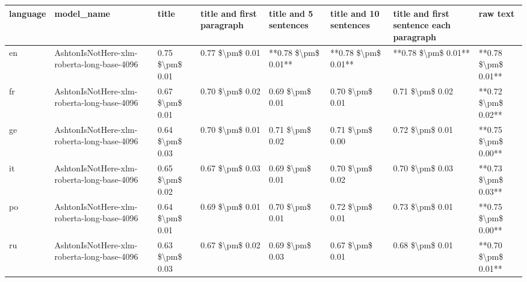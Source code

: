\begin{tabular}{llllllll}
\toprule
language &                                 model\_name &           title & title and first paragraph & title and 5 sentences & title and 10 sentences & title and first sentence each paragraph &            raw text \\
\midrule
      en & AshtonIsNotHere-xlm-roberta-long-base-4096 & 0.75 \$\textbackslash pm\$ 0.01 &           0.77 \$\textbackslash pm\$ 0.01 &   **0.78 \$\textbackslash pm\$ 0.01** &    **0.78 \$\textbackslash pm\$ 0.01** &                     **0.78 \$\textbackslash pm\$ 0.01** & **0.78 \$\textbackslash pm\$ 0.01** \\
      fr & AshtonIsNotHere-xlm-roberta-long-base-4096 & 0.67 \$\textbackslash pm\$ 0.01 &           0.70 \$\textbackslash pm\$ 0.02 &       0.69 \$\textbackslash pm\$ 0.01 &        0.70 \$\textbackslash pm\$ 0.01 &                         0.71 \$\textbackslash pm\$ 0.02 & **0.72 \$\textbackslash pm\$ 0.02** \\
      ge & AshtonIsNotHere-xlm-roberta-long-base-4096 & 0.64 \$\textbackslash pm\$ 0.03 &           0.70 \$\textbackslash pm\$ 0.01 &       0.71 \$\textbackslash pm\$ 0.02 &        0.71 \$\textbackslash pm\$ 0.00 &                         0.72 \$\textbackslash pm\$ 0.01 & **0.75 \$\textbackslash pm\$ 0.00** \\
      it & AshtonIsNotHere-xlm-roberta-long-base-4096 & 0.65 \$\textbackslash pm\$ 0.02 &           0.67 \$\textbackslash pm\$ 0.03 &       0.69 \$\textbackslash pm\$ 0.01 &        0.70 \$\textbackslash pm\$ 0.02 &                         0.70 \$\textbackslash pm\$ 0.03 & **0.73 \$\textbackslash pm\$ 0.03** \\
      po & AshtonIsNotHere-xlm-roberta-long-base-4096 & 0.64 \$\textbackslash pm\$ 0.01 &           0.69 \$\textbackslash pm\$ 0.01 &       0.70 \$\textbackslash pm\$ 0.01 &        0.72 \$\textbackslash pm\$ 0.01 &                         0.73 \$\textbackslash pm\$ 0.01 & **0.75 \$\textbackslash pm\$ 0.00** \\
      ru & AshtonIsNotHere-xlm-roberta-long-base-4096 & 0.63 \$\textbackslash pm\$ 0.03 &           0.67 \$\textbackslash pm\$ 0.02 &       0.69 \$\textbackslash pm\$ 0.03 &        0.67 \$\textbackslash pm\$ 0.01 &                         0.68 \$\textbackslash pm\$ 0.01 & **0.70 \$\textbackslash pm\$ 0.01** \\
\bottomrule
\end{tabular}
